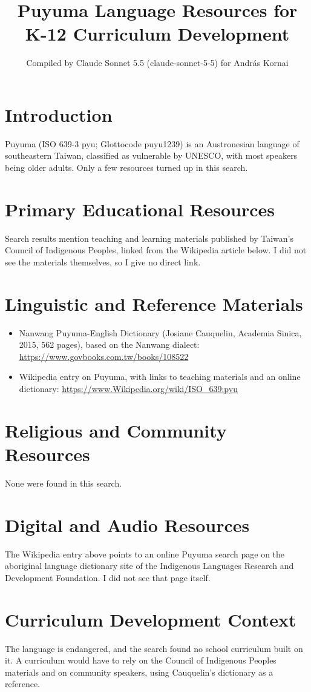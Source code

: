 \documentclass[12pt]{article}
\title{Puyuma Language Resources for K-12 Curriculum Development}
\author{Compiled by Claude Sonnet 5.5 (claude-sonnet-5-5) for Andr\'as Kornai}
\date{}
\begin{document}
\maketitle

\section{Introduction}
Puyuma (ISO 639-3 pyu; Glottocode puyu1239) is an Austronesian language of southeastern Taiwan, classified as vulnerable by UNESCO, with most speakers being older adults. Only a few resources turned up in this search.

\section{Primary Educational Resources}
Search results mention teaching and learning materials published by Taiwan's Council of Indigenous Peoples, linked from the Wikipedia article below. I did not see the materials themselves, so I give no direct link.

\section{Linguistic and Reference Materials}
\begin{itemize}
\item Nanwang Puyuma-English Dictionary (Josiane Cauquelin, Academia Sinica, 2015, 562 pages), based on the Nanwang dialect: \url{https://www.govbooks.com.tw/books/108522}
\item Wikipedia entry on Puyuma, with links to teaching materials and an online dictionary: \url{https://www.Wikipedia.org/wiki/ISO_639:pyu}
\end{itemize}

\section{Religious and Community Resources}
None were found in this search.

\section{Digital and Audio Resources}
The Wikipedia entry above points to an online Puyuma search page on the aboriginal language dictionary site of the Indigenous Languages Research and Development Foundation. I did not see that page itself.

\section{Curriculum Development Context}
The language is endangered, and the search found no school curriculum built on it. A curriculum would have to rely on the Council of Indigenous Peoples materials and on community speakers, using Cauquelin's dictionary as a reference.
\end{document}
